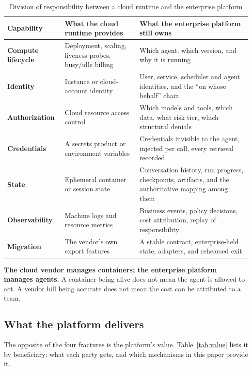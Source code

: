 \begin{table}[htbp]
\centering
\caption{Division of responsibility between a cloud runtime and the enterprise platform}
\label{tab:division}
\begin{tabularx}{\textwidth}{@{}>{\bfseries}L{2.9cm}YY@{}}
  \toprule
  \textbf{Capability} & \textbf{What the cloud runtime provides} & \textbf{What the enterprise platform still owns}\\
  \midrule
  Compute lifecycle & Deployment, scaling, liveness probes, busy/idle billing & Which agent, which version, and why it is running\\
  Identity & Instance or cloud-account identity & User, service, scheduler and agent identities, and the ``on whose behalf'' chain\\
  Authorization & Cloud resource access control & Which models and tools, which data, what risk tier, which structural denials\\
  Credentials & A secrets product or environment variables & Credentials invisible to the agent, injected per call, every retrieval recorded\\
  State & Ephemeral container or session state & Conversation history, run progress, checkpoints, artifacts, and the authoritative mapping among them\\
  Observability & Machine logs and resource metrics & Business events, policy decisions, cost attribution, replay of responsibility\\
  Migration & The vendor's own export features & A stable contract, enterprise-held state, adapters, and rehearsed exit\\
  \bottomrule
\end{tabularx}
\end{table}

\begin{thesisbox}
  \textbf{The cloud vendor manages containers; the enterprise platform manages agents.} A container being alive does not mean the agent is allowed to act. A vendor bill being accurate does not mean the cost can be attributed to a team.
\end{thesisbox}

\subsection{What the platform delivers}

The opposite of the four fractures is the platform's value. Table~\ref{tab:value} lists it by beneficiary: what each party gets, and which mechanisms in this paper provide it.

